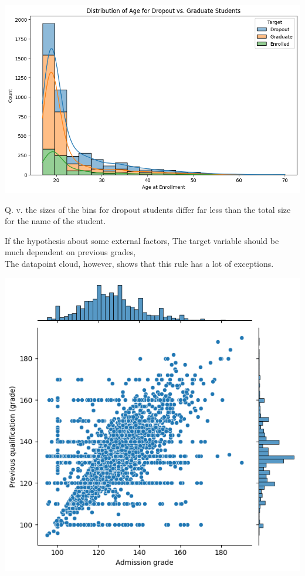 \documentclass[
  letterpaper,
  DIV=11,
  numbers=noendperiod]{scrartcl}
\begin{document}
\includegraphics{report_AzadhdhinNedalYunisAlFraijat_files/figure-pdf/cell-19-output-1.png}

Q. v. the sizes of the bins for dropout students differ far less than
the total size for the name of the student.

If the hypothesis about some external factors, The target variable
should be much dependent on previous grades,\\
The datapoint cloud, however, shows that this rule has a lot of
exceptions.

\includegraphics{report_AzadhdhinNedalYunisAlFraijat_files/figure-pdf/cell-21-output-1.png}
\end{document}
